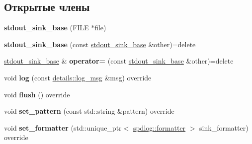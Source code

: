 \subsection*{Открытые члены}
\begin{DoxyCompactItemize}
\item 
\mbox{\label{classspdlog_1_1sinks_1_1stdout__sink__base_a7044a6f292088dbc525961deec8a3823}} 
{\bfseries stdout\+\_\+sink\+\_\+base} (F\+I\+LE $\ast$file)
\item 
\mbox{\label{classspdlog_1_1sinks_1_1stdout__sink__base_a4a8e344fe8ace2a6dc92e9ec4babc6d6}} 
{\bfseries stdout\+\_\+sink\+\_\+base} (const \hyperlink{classspdlog_1_1sinks_1_1stdout__sink__base}{stdout\+\_\+sink\+\_\+base} \&other)=delete
\item 
\mbox{\label{classspdlog_1_1sinks_1_1stdout__sink__base_a67d1dabb63349fe23a004e99f17b54f1}} 
\hyperlink{classspdlog_1_1sinks_1_1stdout__sink__base}{stdout\+\_\+sink\+\_\+base} \& {\bfseries operator=} (const \hyperlink{classspdlog_1_1sinks_1_1stdout__sink__base}{stdout\+\_\+sink\+\_\+base} \&other)=delete
\item 
\mbox{\label{classspdlog_1_1sinks_1_1stdout__sink__base_a42b184a292ea3ccaceaacbc2da70ec53}} 
void {\bfseries log} (const \hyperlink{structspdlog_1_1details_1_1log__msg}{details\+::log\+\_\+msg} \&msg) override
\item 
\mbox{\label{classspdlog_1_1sinks_1_1stdout__sink__base_a362e6d15b80bfc0becd264d23197d7db}} 
void {\bfseries flush} () override
\item 
\mbox{\label{classspdlog_1_1sinks_1_1stdout__sink__base_a4b9a3b76512cc571be1f4a02b9a0463d}} 
void {\bfseries set\+\_\+pattern} (const std\+::string \&pattern) override
\item 
\mbox{\label{classspdlog_1_1sinks_1_1stdout__sink__base_aca9265b7d7c22c6a3cbc81e7363c6a0e}} 
void {\bfseries set\+\_\+formatter} (std\+::unique\+\_\+ptr$<$ \hyperlink{classspdlog_1_1formatter}{spdlog\+::formatter} $>$ sink\+\_\+formatter) override
\end{DoxyCompactItemize}
